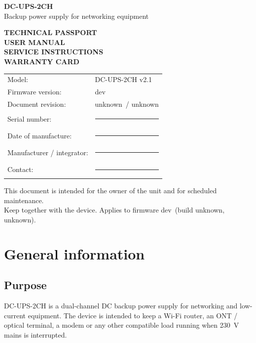 \documentclass[11pt,a4paper]{article}
\newcommand{\hwversion}{v2.1}%
\newcommand{\fwversion}{dev}%
\newcommand{\builddate}{unknown}%
\newcommand{\buildcommit}{unknown}%
\newcommand{\docrev}{unknown}%
\begin{document}
\begin{titlepage}
\centering
\vspace*{18mm}
{\sffamily\bfseries\fontsize{28}{34}\selectfont DC-UPS-2CH\\[3mm]}
{\sffamily\Large Backup power supply for networking equipment\\[12mm]}

\begin{tcolorbox}[width=0.85\textwidth,colback=lightaccent,colframe=accent,boxrule=0.8pt,arc=2mm]
\centering
{\Large\bfseries TECHNICAL PASSPORT\\
USER MANUAL\\
SERVICE INSTRUCTIONS\\
WARRANTY CARD}
\end{tcolorbox}

\vfill
\begin{tabular}{@{}p{55mm}p{90mm}@{}}
Model: & DC-UPS-2CH \hwversion \\
Firmware version: & \fwversion \\
Document revision: & \builddate\ / \docrev \\
Serial number: & \rule{70mm}{0.4pt} \\
Date of manufacture: & \rule{70mm}{0.4pt} \\
Manufacturer / integrator: & \rule{70mm}{0.4pt} \\
Contact: & \rule{70mm}{0.4pt} \\
\end{tabular}

\vfill
{\small This document is intended for the owner of the unit and for scheduled maintenance.\\
Keep together with the device. Applies to firmware \fwversion\ (build \buildcommit, \builddate).}
\end{titlepage}

\tableofcontents
\newpage

\section{General information}

\subsection{Purpose}
DC-UPS-2CH is a dual-channel DC backup power supply for networking and low-current equipment. The device is intended to keep a Wi-Fi router, an ONT / optical terminal, a modem or any other compatible load running when 230~V mains is interrupted.
\end{document}
